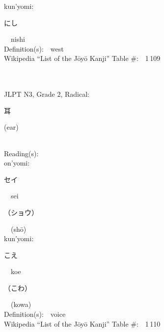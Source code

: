 \begin{multicols}{2}
{\hspace*{1em}}kun'yomi:\ \ \\
{\hspace*{2em}}{\begin{CJK}{UTF8}{min} にし \end{CJK}}\ \ nishi\ \ \\
Definition(s):\ \ west \\
Wikipedia ``List of the J\=oy\=o Kanji'' Table \#:\ \ 1\,109 \\
\ \ \\
{\fontsize{34pt}{40pt}  }\ \ \\  %
{JLPT N3, Grade 2, Radical:\ \ {\begin{CJK}{UTF8}{min} 耳 \end{CJK}} (ear) } \\
Reading(s):\ \ \\
{\hspace*{1em}}on'yomi:\ \ \\
{\hspace*{2em}}{\begin{CJK}{UTF8}{min} セイ \end{CJK}}\ \ sei\ \ \\
{\hspace*{2em}}{\begin{CJK}{UTF8}{min} （ショウ） \end{CJK}}\ \ (sh\=o)\ \ \\
{\hspace*{1em}}kun'yomi:\ \ \\
{\hspace*{2em}}{\begin{CJK}{UTF8}{min} こえ \end{CJK}}\ \ koe\ \ \\
{\hspace*{2em}}{\begin{CJK}{UTF8}{min} （こわ） \end{CJK}}\ \ (kowa)\ \ \\
Definition(s):\ \ voice \\
Wikipedia ``List of the J\=oy\=o Kanji'' Table \#:\ \ 1\,110 \\
\ \ \\
{\fontsize{34pt}{40pt}  }\ \ \\  %

\end{multicols}

